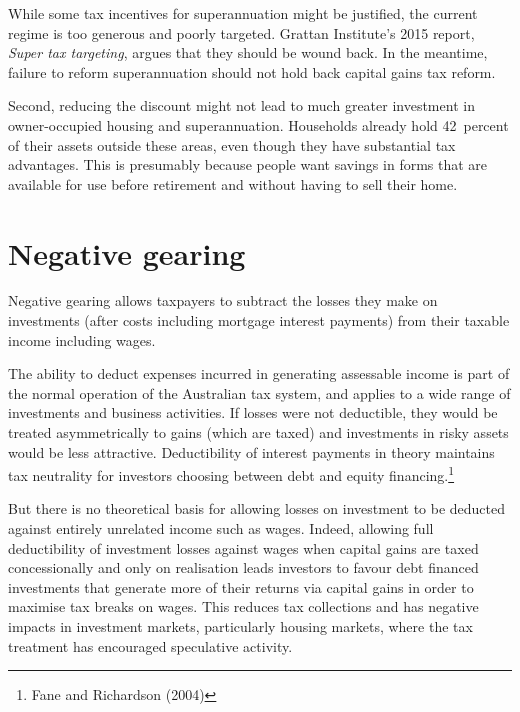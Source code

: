 \documentclass{grattan}\usepackage[]{graphicx}\usepackage[]{color}
\begin{document}
While some tax incentives for superannuation might be justified, the current regime is too generous and poorly targeted. Grattan Institute's 2015 report, \textit{Super tax targeting}, argues that they should be wound back.  In the meantime, failure to reform superannuation should not hold back capital gains tax reform. 



Second, reducing the discount might not lead to much greater investment in owner-occupied housing and superannuation. Households already hold 42~percent of their assets outside these areas, even though they have substantial tax advantages. This is presumably because people want savings in forms that are available for use before retirement and without having to sell their home.  






\chapter{Negative gearing}
Negative gearing allows taxpayers to subtract the losses they make on
investments (after costs including mortgage interest payments) from
their taxable income including wages.

The ability to deduct expenses incurred in generating assessable income
is part of the normal operation of the Australian tax system, and
applies to a wide range of investments and business activities. If
losses were not deductible, they would be treated asymmetrically to
gains (which are taxed) and investments in risky assets would be less
attractive. Deductibility of interest payments in theory maintains tax
neutrality for investors choosing between debt and equity
financing.\footnote{Fane and Richardson (2004)}

But there is no theoretical basis for allowing losses on investment to
be deducted against entirely unrelated income such as wages. Indeed,
allowing full deductibility of investment losses against wages when
capital gains are taxed concessionally and only on realisation leads
investors to favour debt financed investments that generate more of
their returns via capital gains in order to maximise tax breaks on
wages. This reduces tax collections and has negative impacts in
investment markets, particularly housing markets, where the tax
treatment has encouraged speculative activity.
\end{document}
